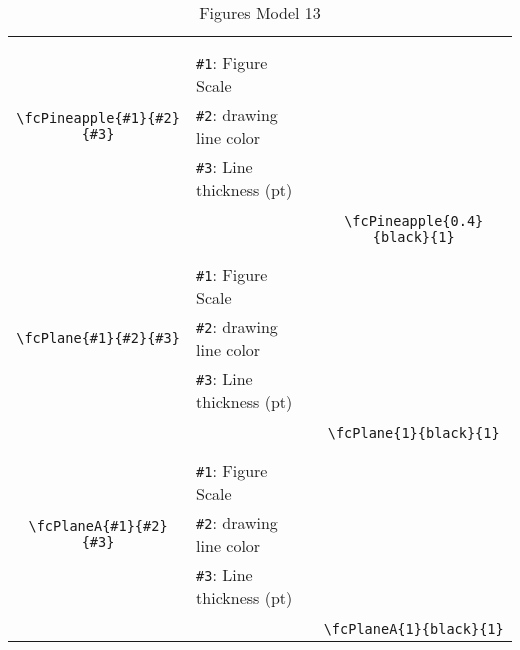\documentclass{article}
\begin{document}
\begin{table}[H]
\begin{tabular}{|c|l|c|}
	&&\multirow{5}{*}{\fcPineapple{0.4}{black}{1}}\\	&&\\	&\verb|#1|: Figure Scale &\\	\verb|\fcPineapple{#1}{#2}{#3}|&	\verb|#2|: drawing line color &\\	&\verb|#3|: Line thickness (pt) &\\ &&\\&&	\verb|\fcPineapple{0.4}{black}{1}|\\\hline 	
	&&\multirow{5}{*}{\fcPlane{1}{black}{1}}\\	&&\\	&\verb|#1|: Figure Scale &\\	\verb|\fcPlane{#1}{#2}{#3}|&	\verb|#2|: drawing line color &\\	&\verb|#3|: Line thickness (pt) &\\ &&\\&&	\verb|\fcPlane{1}{black}{1}|\\\hline 	
	&&\multirow{5}{*}{\fcPlaneA{1}{black}{1}}\\	&&\\	&\verb|#1|: Figure Scale &\\	\verb|\fcPlaneA{#1}{#2}{#3}|&	\verb|#2|: drawing line color &\\	&\verb|#3|: Line thickness (pt) &\\ &&\\&&	\verb|\fcPlaneA{1}{black}{1}|\\\hline 	\hline\end{tabular}\caption{Figures Model 13}\label{tab13}\end{table}
\end{document}
